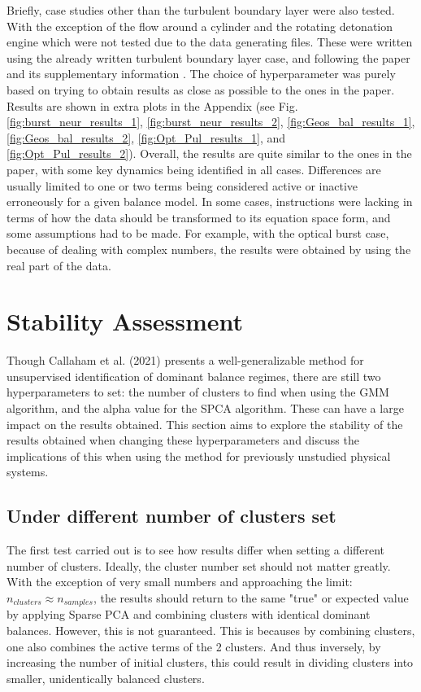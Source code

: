 \documentclass[12pt]{report} %
\begin{document}
Briefly, case studies other than the turbulent boundary layer were also tested. With the exception of the flow around a cylinder and the rotating detonation engine which were not tested due to the data generating files. These were written using the already written turbulent boundary layer case, and following the paper and its supplementary information \cite{callaham2021learning}. The choice of hyperparameter was purely based on trying to obtain results as close as possible to the ones in the paper. Results are shown in extra plots in the Appendix (see Fig. \ref{fig:burst_neur_results_1}, \ref{fig:burst_neur_results_2}, \ref{fig:Geos_bal_results_1}, \ref{fig:Geos_bal_results_2}, \ref{fig:Opt_Pul_results_1}, and \ref{fig:Opt_Pul_results_2}). Overall, the results are quite similar to the ones in the paper, with some key dynamics being identified in all cases. Differences are usually limited to one or two terms being considered active or inactive erroneously for a given balance model. In some cases, instructions were lacking in terms of how the data should be transformed to its equation space form, and some assumptions had to be made. For example, with the optical burst case, because of dealing with complex numbers, the results were obtained by using the real part of the data.

\section{Stability Assessment}

Though Callaham et al. (2021)\cite{callaham2021learning} presents a well-generalizable method for unsupervised identification of dominant balance regimes, there are still two hyperparameters to set: the number of clusters to find when using the GMM algorithm, and the alpha value for the SPCA algorithm. These can have a large impact on the results obtained. This section aims to explore the stability of the results obtained when changing these hyperparameters and discuss the implications of this when using the method for previously unstudied physical systems.

\subsection{Under different number of clusters set}

The first test carried out is to see how results differ when setting a different number of clusters. Ideally, the cluster number set should not matter greatly. With the exception of very small numbers and approaching the limit: $n_{clusters} \approx n_{samples}$,  the results should return to the same "true" or expected value by applying Sparse PCA and combining clusters with identical dominant balances. However, this is not guaranteed. This is becauses by combining clusters, one also combines the active terms of the 2 clusters. And thus inversely, by increasing the number of initial clusters, this could result in dividing clusters into smaller, unidentically balanced clusters.
\end{document}
